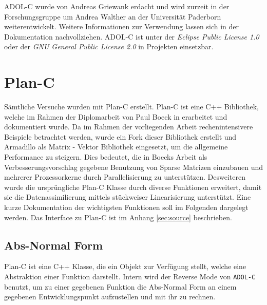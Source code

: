 ADOL-C wurde von Andreas Griewank erdacht und wird zurzeit in der Forschungsgruppe um Andrea Walther an der Universität Paderborn weiterentwickelt. Weitere Informationen zur Verwendung lassen sich in der Dokumentation \cite{walther2012getting} nachvollziehen. ADOL-C ist unter der \textit{Eclipse Public License 1.0} oder der \textit{GNU General Public License 2.0} in Projekten einsetzbar.

\section{Plan-C}
\label{sec:impl:planc}
Sämtliche Versuche wurden mit Plan-C erstellt. Plan-C ist eine C++ Bibliothek, welche im Rahmen der Diplomarbeit von Paul Boeck in \cite{boeck14} erarbeitet und dokumentiert wurde. Da im Rahmen der vorliegenden Arbeit rechenintensivere Beispiele betrachtet werden, wurde ein Fork dieser Bibliothek erstellt und Armadillo als Matrix - Vektor Bibliothek eingesetzt, um die allgemeine Performance zu steigern. Dies bedeutet, die in Boecks Arbeit als Verbesserungsvorschlag gegebene Benutzung von Sparse Matrizen einzubauen und mehrerer Prozessorkerne durch Parallelisierung zu unterstützen.  Desweiteren wurde die ursprüngliche Plan-C Klasse durch diverse Funktionen erweitert, damit sie die Datenassimilierung mittels stückweiser Linearisierung unterstützt. Eine kurze Dokumentation der wichtigsten Funktionen soll im Folgenden dargelegt werden. Das Interface zu Plan-C ist im Anhang \ref{sec:source} beschrieben.

\subsection{Abs-Normal Form}
Plan-C ist eine C++ Klasse, die ein Objekt zur Verfügung stellt, welche eine Abstraktion einer Funktion darstellt. Intern wird der Reverse Mode von \texttt{ADOL-C} benutzt, um zu einer gegebenen Funktion die Abs-Normal Form an einem gegebenen Entwicklungspunkt aufzustellen und mit ihr zu rechnen.

